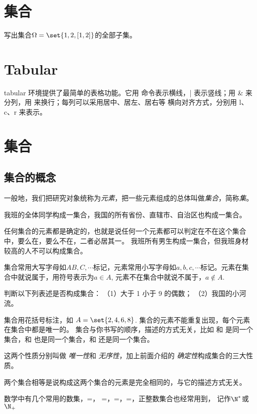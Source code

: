 \documentclass{article}
\begin{document}
\section{集合}
  \question 写出集合$\Omega=\set{1,2,[1,2]}$的全部子集。
\section{Tabular}
  tabular 环境提供了最简单的表格功能。它用  命令表示横线，|
表示竖线；用 \& 来分列，用 \tbs\tbs 来换行；每列可以采用居中、居左、居右等
横向对齐方式，分别用 l、c、r 来表示。



\section{集合}
  \subsection{集合的概念}
    一般地，我们把研究对象统称为\emph{元素}，把一些元素组成的总体叫做\emph{集合}，简称\emph{集}。

    我班的全体同学构成一集合，我国的所有省份、直辖市、自治区也构成一集合。

    任何集合的元素都是确定的，也就是说任何一个元素都可以判定在不在这个集合中，要么在，要么不在，二者必居其一。
    我班所有男生构成一集合，但我班身材较高的人不可以构成集合。

    集合常用大写字母如$AB,C,\cdots$标记，元素常用小写字母如$a,b,c,\cdots$标记。元素在集合中就说属于，用符号表示为$a\in A$, 元素不在集合中就说不属于，$a\not\in A$.

    判断以下列表述是否构成集合：
    （1）大于 1 小于 9 的偶数；
    （2）我国的小河流。

    集合用花括号标注，如 $A=\set{2,4,6,8}$. 集合的元素不能重复出现，每个元素在集合中都是唯一的。
    集合与你书写的顺序，描述的方式无关，比如 和  是同一个集合，和  也是同一个集合，和  还是同一个集合。

    这两个性质分别叫做 \emph{唯一性}和 \emph{无序性}，加上前面介绍的 \emph{确定性}构成集合的三大性质。

    两个集合相等是说构成这两个集合的元素是完全相同的，与它的描述方式无关。

    数学中有几个常用的数集，\N=，
    \Z=，\Q=，\R=，正整数集合也经常用到，
    记作$\N^*$或$\N_+$
\end{document}
